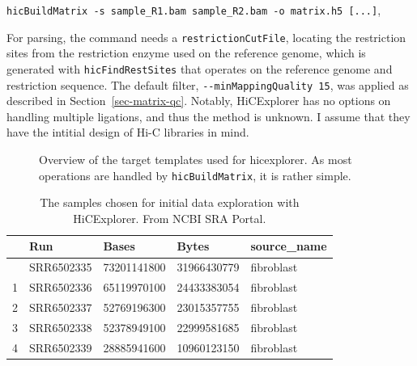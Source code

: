 \documentclass[
  11pt,
  a4paper,
]{scrbook}
\begin{document}
\texttt{hicBuildMatrix\ -s\ sample\_R1.bam\ sample\_R2.bam\ -o\ matrix.h5\ {[}...{]}},

For parsing, the command needs a \texttt{restrictionCutFile}, locating
the restriction sites from the restriction enzyme used on the reference
genome, which is generated with \texttt{hicFindRestSites} that operates
on the reference genome and restriction sequence. The default filter,
\texttt{-\/-minMappingQuality\ 15}, was applied as described in
Section~\ref{sec-matrix-qc}. Notably, HiCExplorer has no options on
handling multiple ligations, and thus the method is unknown. I assume
that they have the intitial design of Hi-C libraries in mind.

\begin{figure}


\caption{\label{fig-hicexplorer-workflow}Overview of the target
templates used for hicexplorer. As most operations are handled by
\texttt{hicBuildMatrix}, it is rather simple.}

\end{figure}%

\small

\begin{longtable}[]{@{}lllll@{}}

\caption{\label{tbl-hic-exploration}The samples chosen for initial data
exploration with HiCExplorer. From NCBI SRA Portal.}

\tabularnewline

\toprule\noalign{}
& Run & Bases & Bytes & source\_name \\
\midrule\noalign{}
\endhead
\bottomrule\noalign{}
\endlastfoot
0 & SRR6502335 & 73201141800 & 31966430779 & fibroblast \\
1 & SRR6502336 & 65119970100 & 24433383054 & fibroblast \\
2 & SRR6502337 & 52769196300 & 23015357755 & fibroblast \\
3 & SRR6502338 & 52378949100 & 22999581685 & fibroblast \\
4 & SRR6502339 & 28885941600 & 10960123150 & fibroblast \\

\end{longtable}
\end{document}
